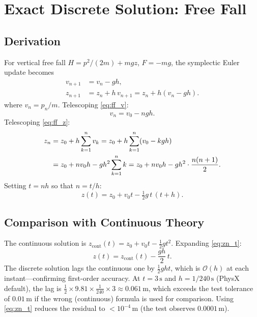 \documentclass[11pt]{article}
\begin{document}
\section{Exact Discrete Solution: Free Fall}

\subsection{Derivation}

For vertical free fall $H = p^2/(2m) + mgz$, $F = -mg$, the symplectic
Euler update becomes
\begin{align}
  v_{n+1} &= v_n - g h, \label{eq:ff_v}\\
  z_{n+1} &= z_n + h\, v_{n+1} = z_n + h(v_n - gh). \label{eq:ff_z}
\end{align}
where $v_n = p_n/m$.  Telescoping \eqref{eq:ff_v}:
\begin{equation}\label{eq:vn}
  v_n = v_0 - n g h.
\end{equation}
Telescoping \eqref{eq:ff_z}:
\begin{align}
  z_n &= z_0 + h \sum_{k=1}^{n} v_k
       = z_0 + h \sum_{k=1}^{n}(v_0 - k g h) \notag\\
      &= z_0 + n v_0 h - g h^2 \sum_{k=1}^{n} k
       = z_0 + n v_0 h - g h^2 \cdot \frac{n(n+1)}{2}. \label{eq:zn}
\end{align}
Setting $t = nh$ so that $n = t/h$:
\begin{equation}\label{eq:zn_t}
  \boxed{z(t) = z_0 + v_0 t - \tfrac{1}{2} g\, t\,(t + h).}
\end{equation}

\subsection{Comparison with Continuous Theory}

The continuous solution is $z_{\mathrm{cont}}(t) = z_0 + v_0 t -
\frac{1}{2}gt^2$.  Expanding \eqref{eq:zn_t}:
\[
  z(t) = z_{\mathrm{cont}}(t) - \frac{gh}{2}\,t.
\]
The discrete solution lags the continuous one by $\frac{1}{2}ght$, which is
$\mathcal{O}(h)$ at each instant---confirming first-order accuracy.  At
$t = 3\,\mathrm{s}$ and $h = 1/240\,\mathrm{s}$ (PhysX default), the lag is
$\frac{1}{2}\times 9.81 \times \frac{1}{240} \times 3 \approx 0.061\,\mathrm{m}$,
which exceeds the test tolerance of $0.01\,\mathrm{m}$ if the wrong
(continuous) formula is used for comparison.  Using \eqref{eq:zn_t}
reduces the residual to $< 10^{-4}\,\mathrm{m}$ (the test observes
$0.0001\,\mathrm{m}$).
\end{document}
